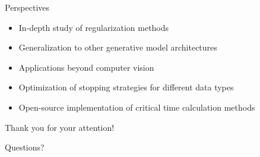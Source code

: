 \documentclass[aspectratio=169]{beamer}
\begin{document}
\begin{frame}{Perspectives}
    \begin{itemize}
        \item In-depth study of regularization methods
        \item Generalization to other generative model architectures
        \item Applications beyond computer vision
        \item Optimization of stopping strategies for different data types
        \item Open-source implementation of critical time calculation methods
    \end{itemize}
\end{frame}

\begin{frame}
    \centering
    \LARGE Thank you for your attention!
    
    \vspace{1cm}
    
    \large Questions?
\end{frame}
\end{document}
